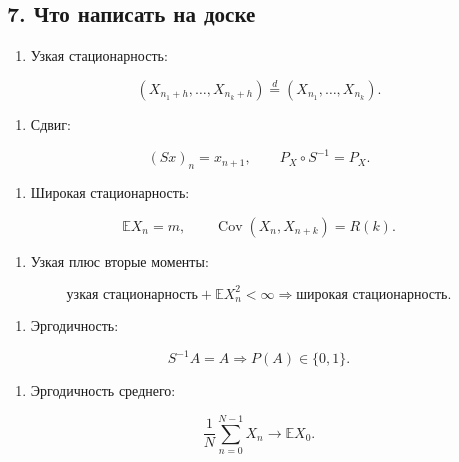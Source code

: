 \documentclass[
  11pt,
  a4paper,
]{article}
\providecommand{\tightlist}{%
  \setlength{\itemsep}{0pt}\setlength{\parskip}{0pt}}
\begin{document}
\subsection{7. Что написать на
доске}\label{ux447ux442ux43e-ux43dux430ux43fux438ux441ux430ux442ux44c-ux43dux430-ux434ux43eux441ux43aux435}

\begin{enumerate}
\def\labelenumi{\arabic{enumi}.}
\tightlist
\item
  Узкая стационарность:
\end{enumerate}

\[
(X_{n_1+h},\ldots,X_{n_k+h})
\stackrel d=
(X_{n_1},\ldots,X_{n_k}).
\]

\begin{enumerate}
\def\labelenumi{\arabic{enumi}.}
\setcounter{enumi}{1}
\tightlist
\item
  Сдвиг:
\end{enumerate}

\[
(Sx)_n=x_{n+1},
\qquad
P_X\circ S^{-1}=P_X.
\]

\begin{enumerate}
\def\labelenumi{\arabic{enumi}.}
\setcounter{enumi}{2}
\tightlist
\item
  Широкая стационарность:
\end{enumerate}

\[
\mathbb E X_n=m,
\qquad
\operatorname{Cov}(X_n,X_{n+k})=R(k).
\]

\begin{enumerate}
\def\labelenumi{\arabic{enumi}.}
\setcounter{enumi}{3}
\tightlist
\item
  Узкая плюс вторые моменты:
\end{enumerate}

\[
\text{узкая стационарность}+\mathbb E X_n^2<\infty
\Longrightarrow
\text{широкая стационарность}.
\]

\begin{enumerate}
\def\labelenumi{\arabic{enumi}.}
\setcounter{enumi}{4}
\tightlist
\item
  Эргодичность:
\end{enumerate}

\[
S^{-1}A=A
\Longrightarrow
P(A)\in\{0,1\}.
\]

\begin{enumerate}
\def\labelenumi{\arabic{enumi}.}
\setcounter{enumi}{5}
\tightlist
\item
  Эргодичность среднего:
\end{enumerate}

\[
\frac1N\sum_{n=0}^{N-1}X_n
\to
\mathbb E X_0.
\]
\end{document}
